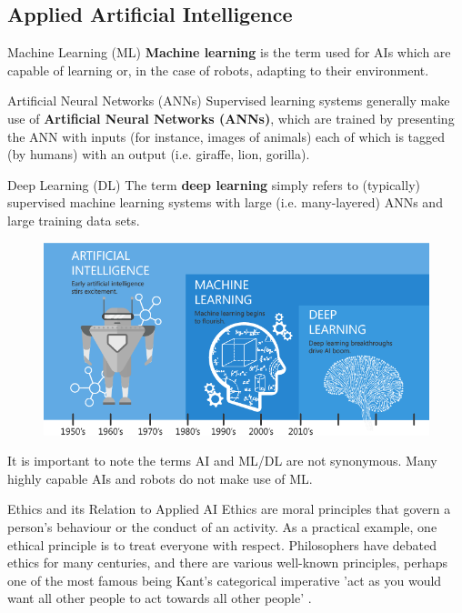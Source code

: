 \documentclass{beamer}
\begin{document}
\subsection{Applied Artificial Intelligence}
\begin{frame}{Machine Learning (ML)}
\textbf{Machine learning} is the term used for AIs which are capable of learning or, in the case of robots, adapting to their environment.
\end{frame}

\begin{frame}{Artificial Neural Networks (ANNs)}
Supervised learning systems generally make use of \textbf{Artificial Neural Networks (ANNs)}, which are trained by presenting the ANN with inputs (for instance, images of animals) each of which is tagged (by humans) with an output (i.e. giraffe, lion, gorilla).
\end{frame}

\begin{frame}{Deep Learning (DL)}
The term \textbf{deep learning} simply refers to (typically) supervised machine learning systems with large (i.e. many-layered) ANNs and large training data sets.
\begin{figure}
\centering
\includegraphics[scale=0.35]{ai-ml-dl-2.png}\\
\end{figure}
It is important to note the terms AI and ML/DL are not synonymous. Many highly capable AIs and robots do not make use of ML.
\end{frame}



\begin{frame}{Ethics and its Relation to Applied AI}
Ethics are moral principles that govern a person's behaviour or the conduct of an activity. As a practical example, one ethical principle is to treat everyone with respect. Philosophers have debated ethics for many centuries, and there are various well-known principles, perhaps one of the most famous being Kant's categorical imperative 'act as you would want all other people to act towards all other people' \citep{kant2008groundwork}.
\end{frame}
\end{document}
